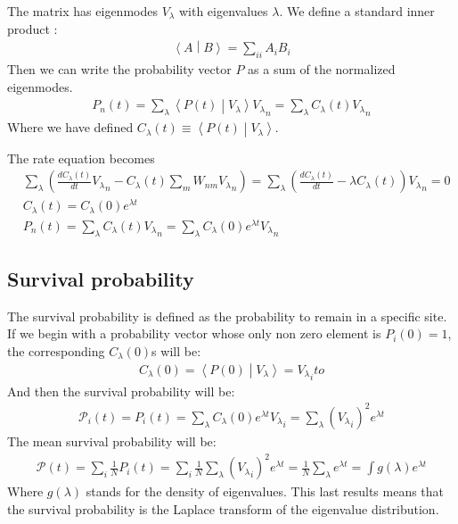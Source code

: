 \documentclass[onecolumn,fleqn]{revtex4}
\newcommand{\inner}[2]{\left \langle #1 \middle| #2\right\rangle} %
\begin{document}
The matrix has eigenmodes $V_\lambda$ with eigenvalues $\lambda$. 
We define a standard inner product :
\begin{align}
\inner{A}{B} = \sum_{ii} A_iB_i
\end{align}
Then we can write the probability vector $P$ as a sum of the normalized eigenmodes.
\begin{align}
P_n(t) = \sum_\lambda \inner{P(t)}{V_\lambda}{V_\lambda }_n = \sum_\lambda C_\lambda(t) {V_\lambda}_n
\end{align}
Where we have defined $C_\lambda(t)\equiv \inner{P(t)}{V_\lambda}$.


The rate equation becomes
\begin{align}
&\sum_\lambda \left( \frac{dC_\lambda(t)}{dt}{V_\lambda}_n - C_\lambda(t)\sum_m W_{nm}{V_\lambda}_n \right)= \sum_\lambda \left( \frac{dC_\lambda(t)}{dt} - \lambda C_\lambda(t)\right){V_\lambda}_n =0\\
&C_\lambda(t) = C_\lambda(0)e^{\lambda t}\\
&P_n(t) = \sum_\lambda C_\lambda(t) {V_\lambda}_n = \sum_\lambda  C_\lambda(0)e^{\lambda t} {V_\lambda}_n 
\end{align}
\subsection{Survival probability}
The survival probability is defined as the probability to remain in a specific site. If we begin with a probability vector whose only non zero element is $P_i(0)=1$, the corresponding $C_\lambda(0)$s will be:
\begin{align}
C_\lambda(0) = \inner{P(0)}{V_\lambda}= {V_\lambda}_ito
\end{align}
And then the survival probability will be:
\begin{align}
\mathcal{P}_i(t) = P_i(t) = \sum_\lambda  C_\lambda(0)e^{\lambda t} {V_\lambda}_i=\sum_\lambda ({V_\lambda}_i)^2 e^{\lambda t} 
\end{align}
The mean survival probability will be:
\begin{align} \label{eq:surv_eigenvalues}
\mathcal{P}(t) = \sum_i \frac{1}{N} P_i(t)=\sum_i \frac{1}{N} \sum_\lambda ({V_\lambda}_i)^2 e^{\lambda t}  =\frac{1}{N}\sum_\lambda e^{\lambda t} = \int g(\lambda) e^{\lambda t}
\end{align}
Where $g(\lambda)$ stands for the density of eigenvalues. This last results means that the survival probability is the Laplace transform of the eigenvalue distribution.
\end{document}

